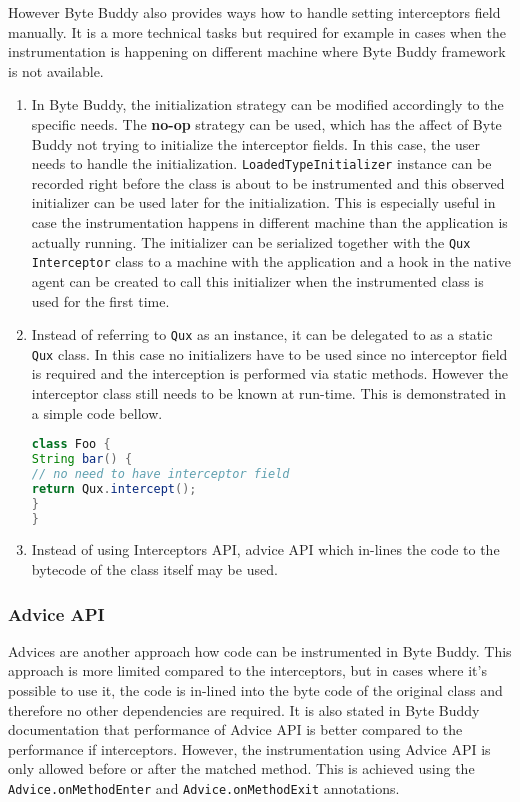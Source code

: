 However Byte Buddy also provides ways how to handle setting interceptors field manually. It is a more technical tasks but required for example in cases when the instrumentation is happening on different machine where Byte Buddy framework is not available.
\begin{enumerate}
\item In Byte Buddy, the initialization strategy can be modified accordingly to the specific needs. The \textbf{no-op} strategy can be used, which has the affect of Byte Buddy not trying to initialize the interceptor fields. In this case, the user needs to handle the initialization. \texttt{LoadedTypeInitializer} instance can be recorded right before the class is about to be instrumented and this observed initializer can be used later for the initialization. This is especially useful in case the instrumentation happens in different machine than the application is actually running. The initializer can be serialized together with the \texttt{Qux} \texttt{Interceptor} class to a machine with the application and a hook in the native agent can be created to call this initializer when the instrumented class is used for the first time.

\item Instead of referring to \texttt{Qux} as an instance, it can be delegated to as a static \texttt{Qux} class. In this case no initializers have to be used since no interceptor field is required and the interception is performed via static methods. However the interceptor class still needs to be known at run-time. This is demonstrated in a simple code bellow.

\begin{lstlisting}[language=Java]
class Foo {
String bar() {
// no need to have interceptor field
return Qux.intercept(); 
}
}
\end{lstlisting}

\item Instead of using Interceptors API, advice API which in-lines the code to the bytecode of the class itself may be used.
\end{enumerate}


\subsubsection{Advice API}
Advices are another approach how code can be instrumented in Byte Buddy. This approach is more limited compared to the interceptors, but in cases where it's possible to use it, the code is in-lined into the byte code of the original class and therefore no other dependencies are required. It is also stated in Byte Buddy documentation that performance of Advice API is better compared to the performance if interceptors.
However, the instrumentation using Advice API is only allowed before or after the matched method. This is achieved using the \texttt{Advice.onMethodEnter} and \texttt{Advice.onMethodExit} annotations. 

